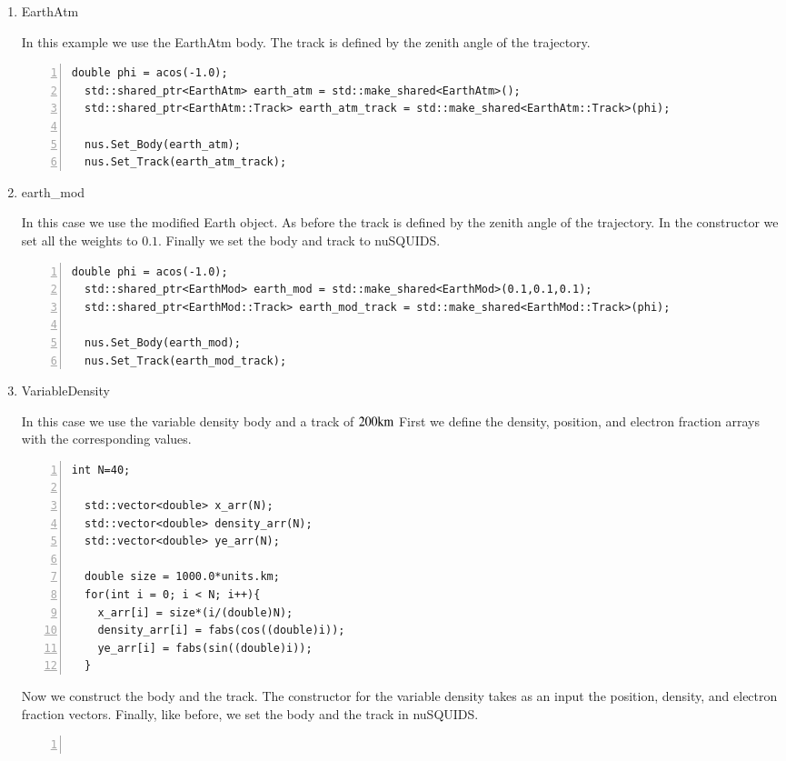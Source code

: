 \documentclass[3p,12pt]{elsarticle}
\newcommand{\ttf}{\ttfamily}
\begin{document}
\begin{enumerate}
\item {\ttf EarthAtm}

In this example we use the {\ttf EarthAtm} body. The
track is defined by the zenith angle of the trajectory.
\begin{lstlisting}[frame=leftline, numbers =
  left,breaklines=true,label = ex:sin1,firstnumber=last]
  double phi = acos(-1.0);
  std::shared_ptr<EarthAtm> earth_atm = std::make_shared<EarthAtm>();
  std::shared_ptr<EarthAtm::Track> earth_atm_track = std::make_shared<EarthAtm::Track>(phi);

  nus.Set_Body(earth_atm);
  nus.Set_Track(earth_atm_track);
\end{lstlisting}

\item {\ttf earth\_mod}

  In this case we use the modified Earth object.
  As before the track is defined by the zenith angle of
  the trajectory. In the constructor we set all the weights to $0.1$.
  Finally we set the body and track to nuSQUIDS.
  
\begin{lstlisting}[frame=leftline, numbers =
  left,breaklines=true,label = ex:sin1,firstnumber=last]
  double phi = acos(-1.0);
  std::shared_ptr<EarthMod> earth_mod = std::make_shared<EarthMod>(0.1,0.1,0.1);
  std::shared_ptr<EarthMod::Track> earth_mod_track = std::make_shared<EarthMod::Track>(phi);  

  nus.Set_Body(earth_mod);
  nus.Set_Track(earth_mod_track);
\end{lstlisting}


\item {\ttf VariableDensity}

In this case we use the variable density body and a track of $200{\rm km}$
First we define the density, position, and electron fraction arrays
with the corresponding values.
\begin{lstlisting}[frame=leftline, numbers =
  left,breaklines=true,label = ex:sin1,firstnumber=last]
  int N=40;

  std::vector<double> x_arr(N);
  std::vector<double> density_arr(N);
  std::vector<double> ye_arr(N);

  double size = 1000.0*units.km;
  for(int i = 0; i < N; i++){
    x_arr[i] = size*(i/(double)N);
    density_arr[i] = fabs(cos((double)i));
    ye_arr[i] = fabs(sin((double)i));
  }
\end{lstlisting}

Now we construct the body and the track. The constructor for the
variable density takes as an input the position, density, and electron
fraction vectors. Finally, like before, we set the body and the track in nuSQUIDS.
\begin{lstlisting}[frame=leftline, numbers =
  left,breaklines=true,label = ex:sin1,firstnumber=last]


\end{lstlisting}
\end{enumerate}
\end{document}
